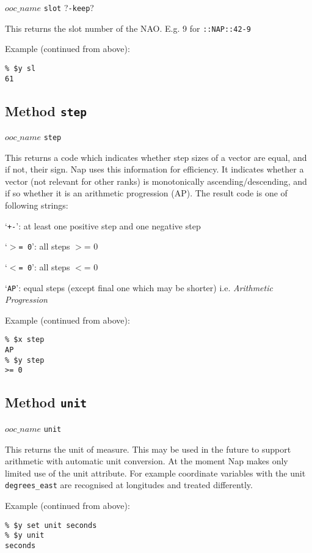 $ooc\_name$ \texttt{slot} ?\texttt{-keep}?

This returns the slot number of the NAO. E.g. 9 for 
  \texttt{::NAP::42-9}

Example (continued from above):
  \begin{verbatim}
% $y sl
61
\end{verbatim}

\subsection{Method \texttt{step}}
    \label{ooc-meta-step}

$ooc\_name$ \texttt{step}

This returns a code which indicates whether step sizes of a vector
  are equal, and if not, their sign. Nap uses this information for
  efficiency. It indicates whether a vector (not relevant for other
  ranks) is monotonically ascending/descending, and if so whether it is
  an arithmetic progression (AP). The result code is one of following
  strings:
\begin{bullets}
    \item `\texttt{+-}': at least one positive step and one negative step
    \item `\texttt{$>$= 0}': all steps $>$= 0
    \item `\texttt{$<$= 0}': all steps $<$= 0
    \item `\texttt{AP}': equal steps (except final one which may be shorter)
	i.e. {\em Arithmetic Progression}
\end{bullets}
  
Example (continued from above):
  \begin{verbatim}
% $x step
AP
% $y step
>= 0
\end{verbatim}

\subsection{Method \texttt{unit}}
    \label{ooc-meta-unit}

  $ooc\_name$ 
  \texttt{unit}

This returns the unit of measure.
This may be used in the future to support arithmetic with automatic unit conversion.
At the moment Nap makes only limited use of the unit attribute.
For example coordinate variables with the unit
\texttt{degrees\_east} are recognised at longitudes and treated differently.

Example (continued from above):
  \begin{verbatim}
% $y set unit seconds
% $y unit
seconds
\end{verbatim}

